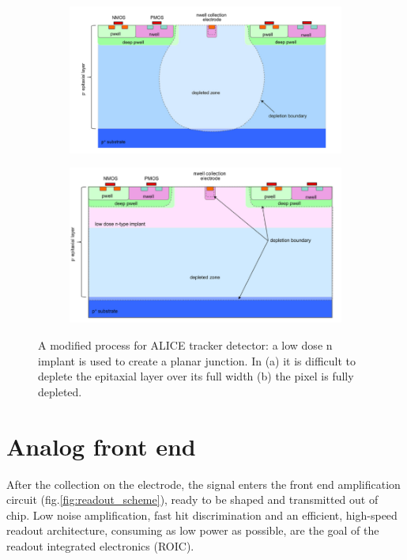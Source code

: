       \begin{figure}
         \centering
         \begin{subfigure}[b]{0.52\textwidth}
             \centering
             \includegraphics[width=\linewidth]{figures/Pixel_detectors/ALPIDE_before_PM.png}
             \caption{}
             \label{fig:ALPIDE_before_PM}
         \end{subfigure}
         \hfill
         \begin{subfigure}[b]{0.47\textwidth}
             \centering
             \includegraphics[width=\linewidth]{figures/Pixel_detectors/ALPIDE_after_PM.png} 
             \caption{}
             \label{fig:ALPIDE_after_PM}
         \end{subfigure}
         \caption{A modified process for ALICE tracker detector: a low dose n implant is used to create a planar junction. In (a) it is difficult to deplete the epitaxial layer over its full
         width (b) the pixel is fully depleted.}
         \label{fig:modified_process}
      \end{figure}

\section{Analog front end}\label{subsec:preamplifier}
   After the collection on the electrode, the signal enters the front end amplification circuit (fig.\ref{fig:readout_scheme}), ready to be shaped and transmitted out of chip. Low noise amplification, fast hit discrimination and an efficient, high-speed readout architecture, consuming as low power as possible, are the goal of the readout integrated electronics (ROIC).

